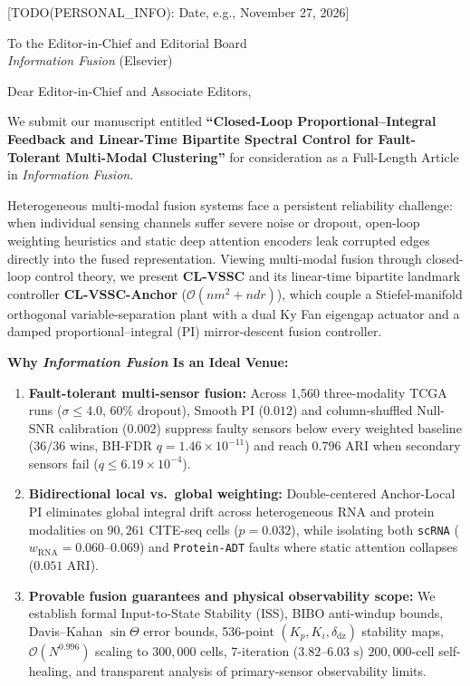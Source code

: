 \documentclass[11pt,letterpaper]{article}
\begin{document}
[TODO(PERSONAL\_INFO): Date, e.g., November 27, 2026]

\vspace{6pt}
To the Editor-in-Chief and Editorial Board\\
\textit{Information Fusion} (Elsevier)

\vspace{6pt}
Dear Editor-in-Chief and Associate Editors,

We submit our manuscript entitled \textbf{``Closed-Loop Proportional--Integral Feedback and Linear-Time Bipartite Spectral Control for Fault-Tolerant Multi-Modal Clustering''} for consideration as a Full-Length Article in \textit{Information Fusion}.

Heterogeneous multi-modal fusion systems face a persistent reliability challenge: when individual sensing channels suffer severe noise or dropout, open-loop weighting heuristics and static deep attention encoders leak corrupted edges directly into the fused representation. Viewing multi-modal fusion through closed-loop control theory, we present \textbf{CL-VSSC} and its linear-time bipartite landmark controller \textbf{CL-VSSC-Anchor} ($\mathcal{O}(nm^2 + ndr)$), which couple a Stiefel-manifold orthogonal variable-separation plant with a dual Ky Fan eigengap actuator and a damped proportional--integral (PI) mirror-descent fusion controller.

\textbf{Why \textit{Information Fusion} Is an Ideal Venue:}
\begin{enumerate}\setlength{\itemsep}{2pt}
    \item \textbf{Fault-tolerant multi-sensor fusion:} Across 1,560 three-modality TCGA runs ($\sigma \le 4.0$, $60\%$ dropout), Smooth PI ($0.012$) and column-shuffled Null-SNR calibration ($0.002$) suppress faulty sensors below every weighted baseline ($36/36$ wins, BH-FDR $q=1.46 \times 10^{-11}$) and reach $0.796$ ARI when secondary sensors fail ($q \le 6.19 \times 10^{-4}$).
    \item \textbf{Bidirectional local vs.\ global weighting:} Double-centered Anchor-Local PI eliminates global integral drift across heterogeneous RNA and protein modalities on $90{,}261$ CITE-seq cells ($p=0.032$), while isolating both \texttt{scRNA} ($w_{\mathrm{RNA}}=0.060\text{--}0.069$) and \texttt{Protein-ADT} faults where static attention collapses ($0.051$ ARI).
    \item \textbf{Provable fusion guarantees and physical observability scope:} We establish formal Input-to-State Stability (ISS), BIBO anti-windup bounds, Davis--Kahan $\sin\Theta$ error bounds, 536-point $(K_p,K_i,\delta_{\mathrm{dz}})$ stability maps, $\mathcal{O}(N^{0.996})$ scaling to $300{,}000$ cells, $7$-iteration ($3.82\text{--}6.03\text{ s}$) $200{,}000$-cell self-healing, and transparent analysis of primary-sensor observability limits.
\end{enumerate}
\end{document}
